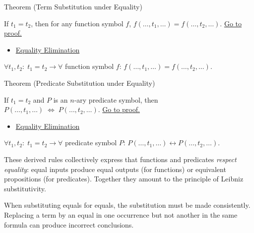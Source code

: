 \begin{theorembox}{Theorem (Term Substitution under Equality)}
\begin{theorem}\label{thm:eq-term}
If $t_1 = t_2$, then for any function symbol $f$,
$f(\dots,t_1,\dots) = f(\dots,t_2,\dots)$.
\hyperref[prf:eq-term]{Go to proof.}
\end{theorem}
\end{theorembox}

\begin{dependencies}
\begin{itemize}
  \item \hyperref[def:eq-elim]{Equality Elimination}
\end{itemize}
\end{dependencies}

\begin{remark*}
$\forall t_1, t_2:\; t_1=t_2 \to \forall$ function symbol $f$: $f(\dots,t_1,\dots) = f(\dots,t_2,\dots)$.
\end{remark*}


\begin{theorembox}{Theorem (Predicate Substitution under Equality)}
\begin{theorem}\label{thm:eq-pred}
If $t_1 = t_2$ and $P$ is an $n$-ary predicate symbol, then
$P(\dots,t_1,\dots) \;\Leftrightarrow\; P(\dots,t_2,\dots)$.
\hyperref[prf:eq-pred]{Go to proof.}
\end{theorem}
\end{theorembox}

\begin{dependencies}
\begin{itemize}
  \item \hyperref[def:eq-elim]{Equality Elimination}
\end{itemize}
\end{dependencies}

\begin{remark*}
$\forall t_1, t_2:\; t_1=t_2 \to \forall$ predicate symbol $P$: $P(\dots,t_1,\dots) \leftrightarrow P(\dots,t_2,\dots)$.
\end{remark*}


\begin{remark*}[Summary]
These derived rules collectively express that functions and predicates
\emph{respect equality}: equal inputs produce equal outputs (for functions) or
equivalent propositions (for predicates). Together they amount to the principle
of Leibniz substitutivity.
\end{remark*}

\begin{remark*}
When substituting equals for equals, the substitution must be made consistently.
Replacing a term by an equal in one occurrence but not another in the same
formula can produce incorrect conclusions.
\end{remark*}
